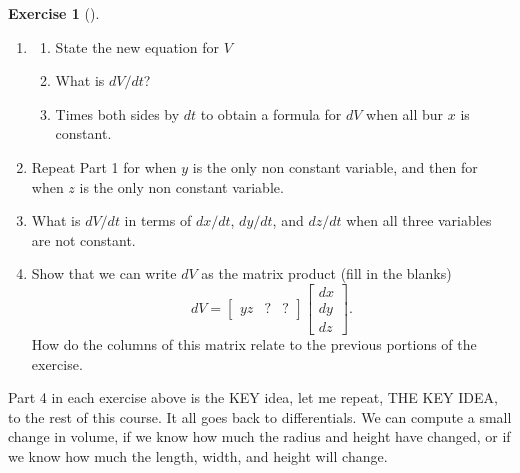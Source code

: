 \documentclass[10pt,]{book}
\theoremstyle{plain}
\theoremstyle{definition}
\theoremstyle{definition}
\theoremstyle{definition}
\theoremstyle{definition}
\newtheorem{exploration}[project]{Exercise}
\theoremstyle{definition}
\numberwithin{equation}{section}
\newcommand{\amp}{&}
\begin{document}
\begin{exploration}[]\label{prob_volumebox}
\leavevmode%
\begin{enumerate}[font=\bfseries,label=(\alph*),ref=\alph*]
\item\label{task-272} \begin{enumerate}[font=\bfseries,label=(\roman*),ref=\theenumi.\roman*]
\item\label{task-273} State the new equation for \(V\)%
\item\label{task-274} What is \(dV/dt\)?%
\item\label{task-275} Times both sides by \(dt\) to obtain a formula for \(dV\) when all bur \(x\) is constant.%
\end{enumerate}
\item\label{task-276} Repeat Part 1 for when \(y\) is the only non constant variable, and then for when \(z\) is the only non constant variable.%
\item\label{task-277} What is \(dV/dt\) in terms of \(dx/dt\), \(dy/dt\), and \(dz/dt\) when all three variables are not constant.%
\item\label{task-278} Show that we can write \(dV\) as the matrix product (fill in the blanks)%
\begin{equation*}
dV = \begin{bmatrix}yz\amp  ?\amp ?
\end{bmatrix} \begin{bmatrix}dx\\dy\\dz
\end{bmatrix} .
\end{equation*}
How do the columns of this matrix relate to the previous portions of the exercise.%
\end{enumerate}
\end{exploration}
Part 4 in each exercise above is the KEY idea, let me repeat, THE KEY IDEA, to the rest of this course. It all goes back to differentials. We can compute a small change in volume, if we know how much the radius and height have changed, or if we know how much the length, width, and height will change.%
\end{document}
